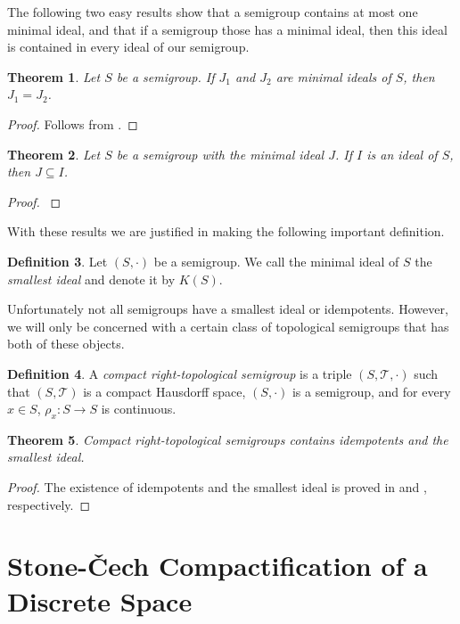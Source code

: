 \documentclass[12pt]{article}
\theoremstyle{plain}
\newtheorem{thm}{Theorem}[section]
\theoremstyle{definition}
\newtheorem{defn}[thm]{Definition}
\newcommand{\calT}{\mathcal{T}}
\begin{document}
The following two easy results show that a semigroup contains at most one minimal ideal, and that if a semigroup those has a minimal ideal, then this ideal is contained in every ideal of our semigroup.

\begin{thm}
  Let $S$ be a semigroup.
  If $J_1$ and $J_2$ are minimal ideals of $S$, then $J_1 = J_2$.
\end{thm}
\begin{proof}
  Follows from \cite[Lemma 1.29]{Hindman:1998fk}.
\end{proof}
\begin{thm}
  Let $S$ be a semigroup with the minimal ideal $J$. 
  If $I$ is an ideal of $S$, then $J \subseteq I$.
\end{thm}
\begin{proof}
  \cite[Lemma 1.49]{Hindman:1998fk}
\end{proof}

With these results we are justified in making the following important definition.
\begin{defn}
  Let $(S,\cdot)$ be a semigroup. 
  We call the minimal ideal of $S$ the \textsl{smallest ideal} and denote it by $K(S)$.
\end{defn}
Unfortunately not all semigroups have a smallest ideal or idempotents. 
However, we will only be concerned with a certain class of topological semigroups that has both of these objects.

\begin{defn}
  A \textsl{compact right-topological semigroup} is a triple $(S,\calT, \cdot)$ such that $(S, \calT)$ is a compact Hausdorff space, $(S, \cdot)$ is a semigroup, and for every $x \in S$, $\rho_x \colon S \to S$ is continuous. 
\end{defn}

\begin{thm}
  Compact right-topological semigroups contains idempotents and the smallest ideal.
\end{thm}
\begin{proof}
  The existence of idempotents and the smallest ideal is proved in \cite[Theorem 2.5]{Hindman:1998fk} and \cite[Theorem 2.8]{Hindman:1998fk}, respectively.
\end{proof}


\section{Stone-\v{C}ech Compactification of a Discrete Space}
\end{document}
